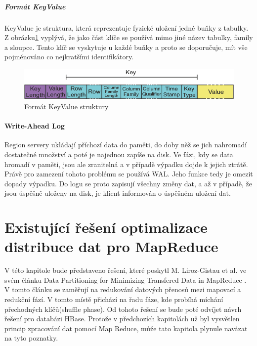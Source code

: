 \documentclass[thesis=M,czech]{FITthesis}[2012/06/26]
\begin{document}
\paragraph{Formát KeyValue}
KeyValue je struktura, která reprezentuje fyzické uložení jedné buňky z tabulky. Z obrázku\ref{fig:keyvalue} vyplývá, že jako část klíče se používá mimo jiné  název tabulky, family a sloupce. Tento klíč se vyskytuje u každé buňky a proto se doporučuje, mít vše pojménováno co nejkratšími identifikátory.	

\begin{figure}\centering
	\includegraphics[width=1\textwidth, angle=0]{files/key-value}
	\caption[Formát KeyValue struktury]{Formát KeyValue struktury}\label{fig:keyvalue}
\end{figure}

\subsubsection{Write-Ahead Log}
Region servery ukládají příchozí data do paměti, do doby něž se jich nahromadí dostatečné množství a poté je najednou zapíše na disk. Ve fázi, kdy se data hromadí v paměti, jsou ale zranitelná a v případě výpadku dojde k jejich ztrátě. Právě pro zamezení tohoto problému se používá WAL. Jeho funkce tedy je omezit dopady výpadku. Do logu se proto zapisují všechny změny dat, a až v případě, že jsou úspěšně uloženy na disk, je klient informován o úspěšném uložení dat. 






\chapter{Existující řešení optimalizace distribuce dat pro MapReduce}
V této kapitole bude představeno řešení, které poskytl M. Liroz-Gistau et al. ve svém článku Data Partitioning for Minimizing Transfered Data in MapReduce \cite{gistau}. V tomto článku se zaměřují na redukování datových přenosů mezi mapovací a redukční fází. V tomto místě přichází na řadu fáze, kde probíhá míchání přechodných klíčů(shuffle phase). Od tohoto řešení se bude poté odvíjet návrh řešení pro databázi HBase. Protože v předchozích kapitolách už byl vysvětlen princip zpracování dat pomocí Map Reduce, může tato kapitola plynule navázat na tyto poznatky. 
\end{document}
